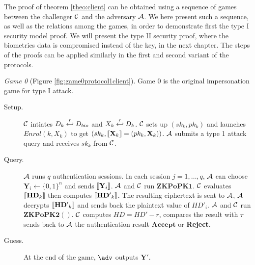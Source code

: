 The proof of theorem \ref{theo:client} can be obtained using a sequence of games
between the challenger $\mathcal{C}$ and the adversary $\mathcal{A}$. We here
present such a sequence, as well as the relations among the games, in order to
demonstrate first the type I security model proof. We will present the type II
security proof, where the biometrics data is compromised instead of the key, in
the next chapter. The steps of the proofs can be applied similarly in the first
and second variant of the protocols.

\textit{Game 0} (Figure \ref{fig:game0protocol1client}). Game 0 is the original
impersonation game for type I attack.
\begin{description}
\item [Setup.] $\mathcal{C}$ intiates $D_k \stackrel{r}{\hookleftarrow} D_{bio}$ and
  $X_k \stackrel{r}{\hookleftarrow} D_k$. $\mathcal{C}$ sets up $(sk_k, pk_k)$ and launches
  $Enrol(k, X_k)$ to get $(sk_k, \left\llbracket\mathbf{X}_{k}\right\rrbracket =(pk_k, \mathbf{X}_{k}))$.
  $\mathcal{A}$ submits a type 1 attack query and receives $sk_k$ from
  $\mathcal{C}$.
\item [Query.] $\mathcal{A}$ runs $q$ authentication sessions. In each session
  $j = 1, \dots, q$, $\mathcal{A}$ can choose $\mathbf{Y}_{i} \gets \{0,1\}^{n}$
  and sends $\left\llbracket\mathbf{Y}_{i}\right\rrbracket$. $\mathcal{A}$ and $\mathcal{C}$ run
  $\mathbf{ZKPoPK1}$. $\mathcal{C}$ evaluates $\left\llbracket\mathbf{HD}_{k}\right\rrbracket$ then
  computes $\left\llbracket\mathbf{HD'}_{k}\right\rrbracket$. The resulting ciphertext is sent to
  $\mathcal{A}$, $\mathcal{A}$ decrypts $\left\llbracket\mathbf{HD'}_{k}\right\rrbracket$ and sends back the
  plaintext value of $HD'_{i}$. $\mathcal{A}$ and $\mathcal{C}$ run
  $\mathbf{ZKPoPK2}()$. $\mathcal{C}$ computes $HD = HD' - r$, compares the result with $\tau$ sends back to $\mathcal{A}$ the authentication result $\mathbf{Accept}$ or \textbf{Reject}.
\item [Guess.] At the end of the game, $\adv$ outputs $\mathbf{Y'}$.
\end{description}

